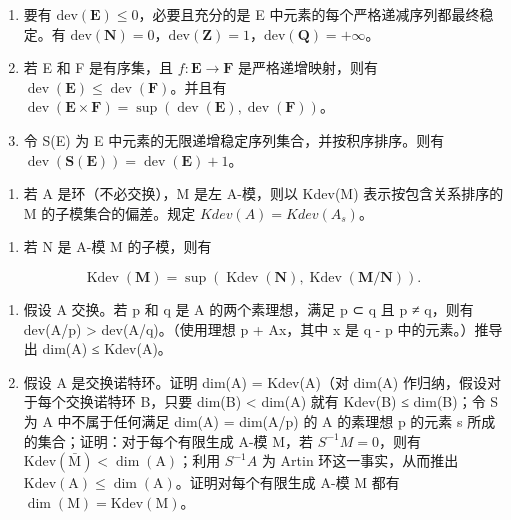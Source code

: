 \begin{enumerate}
\def\labelenumi{\alph{enumi})}
\setcounter{enumi}{1}
\item
  要有 \(\text{dev}(\mathbf{E}) \leqslant 0\)，必要且充分的是 E 中元素的每个严格递减序列都最终稳定。有 \(\text{dev}(\mathbf{N}) = 0\)，\(\text{dev}(\mathbf{Z}) = 1\)，\(\text{dev}(\mathbf{Q}) = +\infty\)。
\item
  若 E 和 F 是有序集，且 \(f: \mathbf{E} \to \mathbf{F}\) 是严格递增映射，则有 \(\operatorname{dev}(\mathbf{E}) \leqslant \operatorname{dev}(\mathbf{F})\)。并且有 \(\operatorname{dev}(\mathbf{E} \times \mathbf{F}) = \sup(\operatorname{dev}(\mathbf{E}), \operatorname{dev}(\mathbf{F}))\)。
\item
  令 S(E) 为 E 中元素的无限递增稳定序列集合，并按积序排序。则有 \(\operatorname{dev}(\mathbf{S}(\mathbf{E})) = \operatorname{dev}(\mathbf{E}) + 1\)。
\end{enumerate}

\begin{enumerate}
\def\labelenumi{\arabic{enumi})}
\setcounter{enumi}{4}
\tightlist
\item
  若 A 是环（不必交换），M 是左 A-模，则以 Kdev(M) 表示按包含关系排序的 M 的子模集合的偏差。规定 \(Kdev(A) = Kdev(A_s)\)。
\end{enumerate}

\begin{enumerate}
\def\labelenumi{\alph{enumi})}
\tightlist
\item
  若 N 是 A-模 M 的子模，则有
\end{enumerate}

\[
\operatorname{Kdev} (\mathbf {M}) = \sup (\operatorname{Kdev} (\mathbf {N}), \operatorname{Kdev} (\mathbf {M} / \mathbf {N}))  .
\]

\begin{enumerate}
\def\labelenumi{\alph{enumi})}
\setcounter{enumi}{1}
\item
  假设 A 交换。若 p 和 q 是 A 的两个素理想，满足 p ⊂ q 且 p ≠ q，则有 dev(A/p) \textgreater{} dev(A/q)。（使用理想 p + Ax，其中 x 是 q - p 中的元素。）推导出 dim(A) ≤ Kdev(A)。
\item
   假设 A 是交换诺特环。证明 dim(A) = Kdev(A)（对 dim(A) 作归纳，假设对于每个交换诺特环 B，只要 dim(B) \textless{} dim(A) 就有 Kdev(B) ≤ dim(B)；令 S 为 A 中不属于任何满足 dim(A) = dim(A/p) 的 A 的素理想 p 的元素 s 所成的集合；证明：对于每个有限生成 A-模 M，若 \(S^{-1}M = 0\)，则有 \(\mathrm{Kdev}(\bar{\mathrm{M}}) < \dim(\mathrm{A})\)；利用 \(S^{-1}A\) 为 Artin 环这一事实，从而推出 \(\mathrm{Kdev}(\mathrm{A}) \leqslant \dim(\mathrm{A})\)。证明对每个有限生成 A-模 M 都有 \(\dim(\mathrm{M}) = \mathrm{Kdev}(\mathrm{M})\)。
\end{enumerate}

